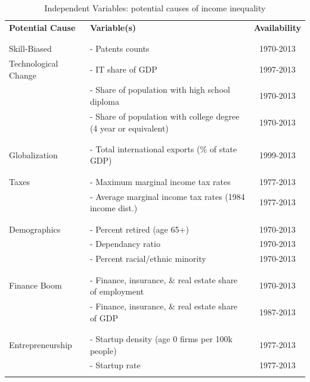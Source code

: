 \documentclass[11pt]{article}
\theoremstyle{definition}
\numberwithin{equation}{section}
\begin{document}
\begin{table}[htb!]
\caption{Independent Variables: potential causes of income inequality} \label{tab_indep_var}
\centering
\begin{tabular}{l|l|c}
 \hline  
 \hline	
	{\bf Potential Cause} & {\bf Variable(s)} & {\bf Availability} \\ 
	&&\\ \hline 
	&&\\
	\multirow{1}{*}{Skill-Biased  }			& - Patents counts   & 1970-2013 \\
	\multirow{1}{*}{Technological Change  }	& - IT share of GDP 		&  1997-2013\\ 
											& - Share of population with high school diploma  	& 	1970-2013 \\
	 										& - Share of population with college degree (4 year or equivalent) 		&  	1970-2013\\  
	&&\\ \hline 
	&&\\
	\multirow{1}{*}{Globalization } & - Total international exports (\% of state GDP) &  1999-2013\\ 
	&&\\ \hline 
	&&\\
	\multirow{1}{*}{Taxes }	& - Maximum marginal income tax rates   							& 1977-2013 \\
							& - Average marginal income tax rates (1984 income dist.)   & 1977-2013 \\
	&&\\ \hline 
	&&\\
	\multirow{1}{*}{Demographics }  & - Percent retired (age 65+)  								&  	1970-2013 \\
	 								& - Dependancy ratio  	& 	1970-2013 \\
	 								& - Percent racial/ethnic minority  						&  	1970-2013 \\
	&&\\ \hline 	
	&&\\ 
	\multirow{1}{*}{Finance Boom } 	& - Finance, insurance, \& real estate share of employment	& 1970-2013 \\
									& - Finance, insurance, \& real estate share of GDP			& 1987-2013 \\
	&&\\ \hline 
	&&\\
	\multirow{1}{*}{Entrepreneurship }	& - Startup density (age 0 firms per 100k people) &  1977-2013 \\
	 									& - Startup rate  										& 1977-2013 \\
	&&\\ \hline 		
\end{tabular}
\end{table}
\end{document}
